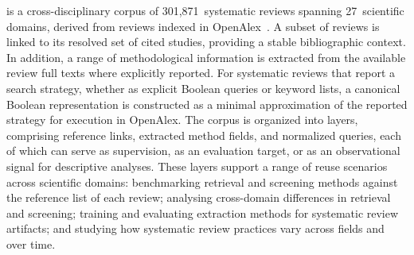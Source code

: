 \webisSRCorpus{} is a cross-disciplinary corpus of 301,871~systematic reviews spanning 27~scientific domains, derived from reviews indexed in OpenAlex~\cite{Priem2022OpenAlexAF}. A subset of reviews is linked to its resolved set of cited studies, providing a stable bibliographic context. In addition, a range of methodological information is extracted from the available review full texts where explicitly reported. For systematic reviews that report a search strategy, whether as explicit Boolean queries or keyword lists, a canonical Boolean representation is constructed as a minimal approximation of the reported strategy for execution in OpenAlex. The corpus is organized into layers, comprising reference links, extracted method fields, and normalized queries, each of which can serve as supervision, as an evaluation target, or as an observational signal for descriptive analyses. These layers support a range of reuse scenarios across scientific domains: benchmarking retrieval and screening methods against the reference list of each review; analysing cross-domain differences in retrieval and screening; training and evaluating extraction methods for systematic review artifacts; and studying how systematic review practices vary across fields and over time.
